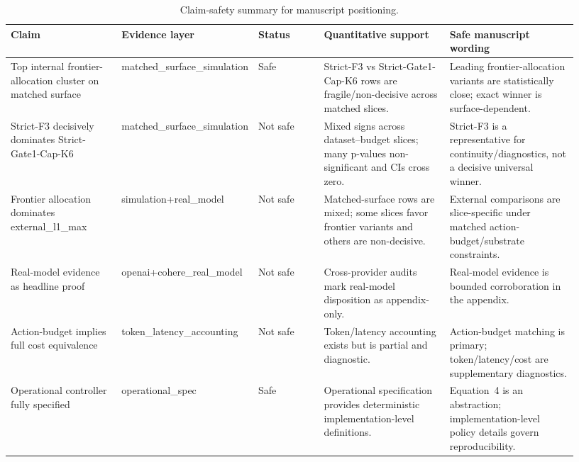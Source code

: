 \begin{table}[t]
\centering
\small
\caption{Claim-safety summary for manuscript positioning.}
\begin{tabular}{p{0.2\linewidth}p{0.15\linewidth}p{0.12\linewidth}p{0.23\linewidth}p{0.23\linewidth}}
\hline
\textbf{Claim} & \textbf{Evidence layer} & \textbf{Status} & \textbf{Quantitative support} & \textbf{Safe manuscript wording} \\
\hline
Top internal frontier-allocation cluster on matched surface & matched\_surface\_simulation & Safe & Strict-F3 vs Strict-Gate1-Cap-K6 rows are fragile/non-decisive across matched slices. & Leading frontier-allocation variants are statistically close; exact winner is surface-dependent. \\
Strict-F3 decisively dominates Strict-Gate1-Cap-K6 & matched\_surface\_simulation & Not safe & Mixed signs across dataset--budget slices; many p-values non-significant and CIs cross zero. & Strict-F3 is a representative for continuity/diagnostics, not a decisive universal winner. \\
Frontier allocation dominates external\_l1\_max & simulation+real\_model & Not safe & Matched-surface rows are mixed; some slices favor frontier variants and others are non-decisive. & External comparisons are slice-specific under matched action-budget/substrate constraints. \\
Real-model evidence as headline proof & openai+cohere\_real\_model & Not safe & Cross-provider audits mark real-model disposition as appendix-only. & Real-model evidence is bounded corroboration in the appendix. \\
Action-budget implies full cost equivalence & token\_latency\_accounting & Not safe & Token/latency accounting exists but is partial and diagnostic. & Action-budget matching is primary; token/latency/cost are supplementary diagnostics. \\
Operational controller fully specified & operational\_spec & Safe & Operational specification provides deterministic implementation-level definitions. & Equation~4 is an abstraction; implementation-level policy details govern reproducibility. \\
\hline
\end{tabular}
\end{table}
